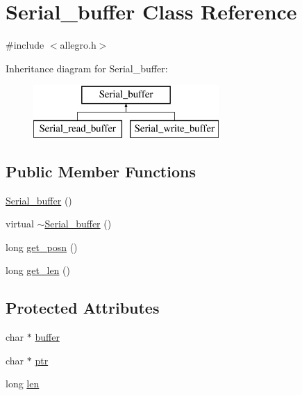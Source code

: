 \hypertarget{class_serial__buffer}{}\section{Serial\+\_\+buffer Class Reference}
\label{class_serial__buffer}


{\ttfamily \#include $<$allegro.\+h$>$}

Inheritance diagram for Serial\+\_\+buffer\+:\begin{figure}[H]
\begin{center}
\leavevmode
\includegraphics[height=2.000000cm]{class_serial__buffer}
\end{center}
\end{figure}
\subsection*{Public Member Functions}
\begin{DoxyCompactItemize}
\item 
\hyperlink{class_serial__buffer_aa36c343afb4905c83c81c82d78d5e819}{Serial\+\_\+buffer} ()
\item 
virtual \hyperlink{class_serial__buffer_ac87e7f08b3085d3d9baad85568008139}{$\sim$\+Serial\+\_\+buffer} ()
\item 
long \hyperlink{class_serial__buffer_a8130ec8288aacf5a35f93bda0a8273ea}{get\+\_\+posn} ()
\item 
long \hyperlink{class_serial__buffer_a826d3504ea1da67627b1a7482cebbf58}{get\+\_\+len} ()
\end{DoxyCompactItemize}
\subsection*{Protected Attributes}
\begin{DoxyCompactItemize}
\item 
char $\ast$ \hyperlink{class_serial__buffer_a0daee3ecf8d774980250eecd243ecc70}{buffer}
\item 
char $\ast$ \hyperlink{class_serial__buffer_ab39b90533bf801d77ab85c4543360297}{ptr}
\item 
long \hyperlink{class_serial__buffer_ac61bd539ff999551abc6f2723caa9602}{len}
\end{DoxyCompactItemize}


